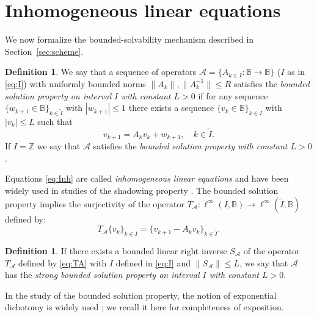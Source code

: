 \documentclass[12pt]{article}
\newcommand{\Bb}{\mathbb{B}}
\newcommand{\Zz}{\mathbb{Z}}
\theoremstyle{definition}
\newtheorem{defin}[thm]{Definition}
\begin{document}
\section{Inhomogeneous linear equations}\label{sec:inh}

We now formalize the bounded-solvability mechanism described in Section~\ref{sec:scheme}.

\begin{defin}\label{def:bs}
    We say that a sequence of operators $\mathcal{A} = \{A_{k\in I}:\Bb \to \Bb\}$ ($I$ as in \eqref{eq:I}) with uniformly bounded norms $\|A_k\|, \|A_k^{-1}\| \leq R$ satisfies the \textit{bounded solution property on interval $I$ with constant $L>0$} if  for any sequence $\{w_{k+1} \in \Bb\}_{k \in \tilde{I}}$ with $|w_{k+1}| \leq 1$ there exists a sequence $\{v_k \in \Bb\}_{k \in I}$ with $|v_k| \leq L$ such that
    \begin{equation}\label{eq:Inh}
    v_{k+1} = A_k v_k + w_{k+1}, \quad k \in \tilde{I}.        
    \end{equation}
    If $I = \Zz$ we say that $\mathcal{A}$ satisfies the \textit{bounded solution property with constant $L>0$}.
\end{defin}

Equations \eqref{eq:Inh} are called \textit{inhomogeneous linear equations} \cite{Pli77, Coppel, Maizel1954, Palmer1984, Palmer1988, Slyusarchuk1983, ChiconeLatushkin1999, LRS-JDDE1998} and have been widely used in studies of the shadowing property \cite{Palmer2000, TikhLipSh, TikhHolSh, TikhPerSh, TikhZapSem, MonTikh, PriezzhevsTikh, Pilyugin2010, Todorov2013, Palmer1984, Palmer1988DR, BackesDragicevic2021, BD2019, BD2022}.
The bounded solution property implies the surjectivity of the operator 
$T_{\mathcal{A}}: \ell^{\infty}(I, \Bb) \to \ell^{\infty}(\tilde{I}, \Bb)$ defined by:
\begin{equation}\label{eq:TA}
T_{\mathcal{A}}\{v_k\}_{k \in I} = \{v_{k+1}-A_kv_k\}_{k \in \tilde{I}}.   
\end{equation}

\begin{defin}\label{def:sbs}
If there exists  a bounded linear right inverse $S_{\mathcal{A}}$ of the operator $T_{\mathcal{A}}$ defined by \eqref{eq:TA} with $I$ defined in \eqref{eq:I} and $\|S_{\mathcal{A}}\| \leq L$, we say that $\mathcal{A}$ has the \textit{strong bounded solution property on interval $I$ with constant $L > 0$}. 
\end{defin}


In the study of the bounded solution property, the notion of exponential dichotomy is widely used \cite{BDV2018,ChiconeLatushkin1999,Coppel,Henry94,Maizel1954,
Palmer1988,Slyusarchuk1983}; we recall it here for completeness of exposition.
\end{document}
